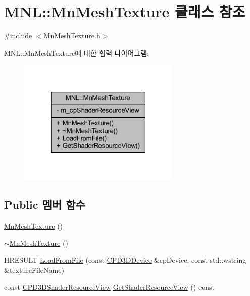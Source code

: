 \hypertarget{class_m_n_l_1_1_mn_mesh_texture}{}\section{M\+NL\+:\+:Mn\+Mesh\+Texture 클래스 참조}
\label{class_m_n_l_1_1_mn_mesh_texture}


{\ttfamily \#include $<$Mn\+Mesh\+Texture.\+h$>$}



M\+NL\+:\+:Mn\+Mesh\+Texture에 대한 협력 다이어그램\+:\nopagebreak
\begin{figure}[H]
\begin{center}
\leavevmode
\includegraphics[width=220pt]{class_m_n_l_1_1_mn_mesh_texture__coll__graph}
\end{center}
\end{figure}
\subsection*{Public 멤버 함수}
\begin{DoxyCompactItemize}
\item 
\hyperlink{class_m_n_l_1_1_mn_mesh_texture_ac29132ecef67120fbcb9f5f34abfe24a}{Mn\+Mesh\+Texture} ()
\item 
\hyperlink{class_m_n_l_1_1_mn_mesh_texture_ae49980cf93b9164685c8c569335f16d8}{$\sim$\+Mn\+Mesh\+Texture} ()
\item 
H\+R\+E\+S\+U\+LT \hyperlink{class_m_n_l_1_1_mn_mesh_texture_acd57364c25a3304f5f80cdd2f2ff310d}{Load\+From\+File} (const \hyperlink{namespace_m_n_l_a1eec210db8f309a4a9ac0d9658784c31}{C\+P\+D3\+D\+Device} \&cp\+Device, const std\+::wstring \&texture\+File\+Name)
\item 
const \hyperlink{namespace_m_n_l_a93794d93663474ff79c950ed985565aa}{C\+P\+D3\+D\+Shader\+Resource\+View} \hyperlink{class_m_n_l_1_1_mn_mesh_texture_a98696085fe42950f2bf6eb4e508cdcb7}{Get\+Shader\+Resource\+View} () const
\end{DoxyCompactItemize}
